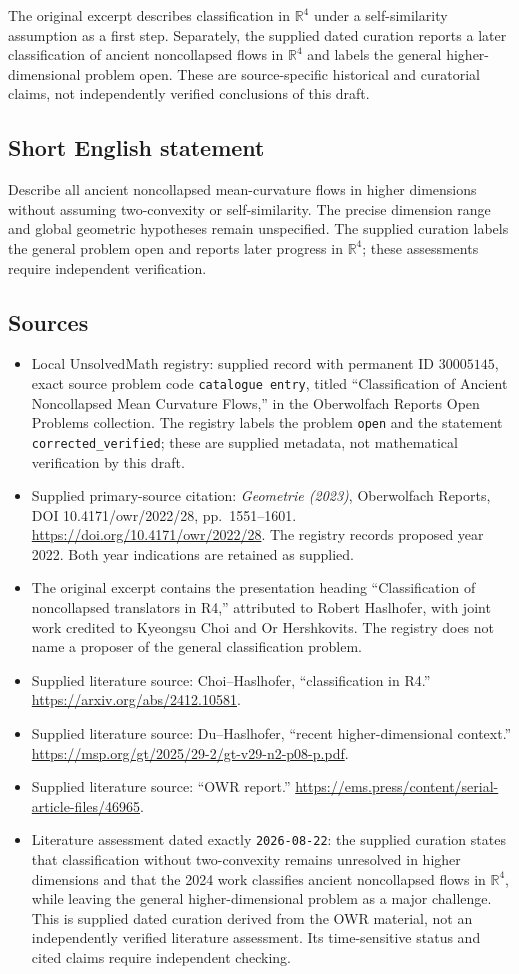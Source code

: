 \documentclass[11pt]{article}
\newcommand{\R}{\mathbb{R}}
\begin{document}
The original excerpt describes classification in \(\R^4\) under a self-similarity assumption as a first step. Separately, the supplied dated curation reports a later classification of ancient noncollapsed flows in \(\R^4\) and labels the general higher-dimensional problem open. These are source-specific historical and curatorial claims, not independently verified conclusions of this draft.
\subsection{Short English statement}
Describe all ancient noncollapsed mean-curvature flows in higher dimensions without assuming two-convexity or self-similarity. The precise dimension range and global geometric hypotheses remain unspecified. The supplied curation labels the general problem open and reports later progress in \(\R^4\); these assessments require independent verification.
\subsection{Sources}
\begin{itemize}
\item Local UnsolvedMath registry: supplied record with permanent ID \(30005145\), exact source problem code \texttt{catalogue entry}, titled ``Classification of Ancient Noncollapsed Mean Curvature Flows,'' in the Oberwolfach Reports Open Problems collection. The registry labels the problem \texttt{open} and the statement \texttt{corrected\_verified}; these are supplied metadata, not mathematical verification by this draft.
\item Supplied primary-source citation: \emph{Geometrie (2023)}, Oberwolfach Reports, DOI 10.4171/owr/2022/28, pp.\ 1551--1601. \url{https://doi.org/10.4171/owr/2022/28}. The registry records proposed year 2022. Both year indications are retained as supplied.
\item The original excerpt contains the presentation heading ``Classification of noncollapsed translators in R4,'' attributed to Robert Haslhofer, with joint work credited to Kyeongsu Choi and Or Hershkovits. The registry does not name a proposer of the general classification problem.
\item Supplied literature source: Choi--Haslhofer, ``classification in R4.'' \url{https://arxiv.org/abs/2412.10581}.
\item Supplied literature source: Du--Haslhofer, ``recent higher-dimensional context.'' \url{https://msp.org/gt/2025/29-2/gt-v29-n2-p08-p.pdf}.
\item Supplied literature source: ``OWR report.'' \url{https://ems.press/content/serial-article-files/46965}.
\item Literature assessment dated exactly \texttt{2026-08-22}: the supplied curation states that classification without two-convexity remains unresolved in higher dimensions and that the 2024 work classifies ancient noncollapsed flows in \(\R^4\), while leaving the general higher-dimensional problem as a major challenge. This is supplied dated curation derived from the OWR material, not an independently verified literature assessment. Its time-sensitive status and cited claims require independent checking.
\end{itemize}
\end{document}
